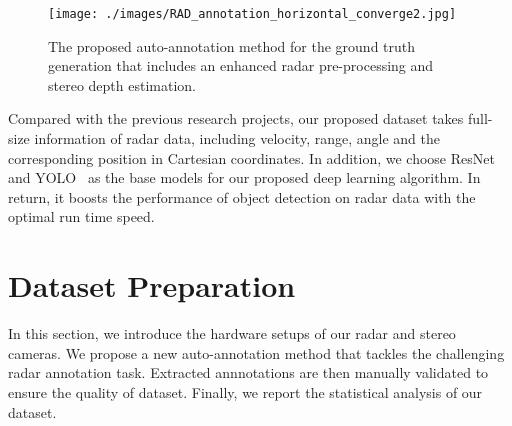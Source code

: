 \documentclass[10pt, conference, compsocconf]{IEEEtran}
\begin{document}
\begin{figure*}[!t]
	\centering
	\texttt{[image: ./images/RAD\_annotation\_horizontal\_converge2.jpg]}
	\caption{The proposed auto-annotation method for the ground truth generation that includes an enhanced radar pre-processing and stereo depth estimation.}
	\label{F:InstancizeProposal}
\end{figure*}

Compared with the previous research projects, our proposed dataset takes full-size information of radar data, including velocity, range, angle and the corresponding position in Cartesian coordinates. In addition, we choose ResNet~\cite{BG:ResNet} and YOLO~\cite{Ref:YOLOv4} as the base models for our proposed deep learning algorithm. In return, it boosts the performance of object detection on radar data with the optimal run time speed.


\section{Dataset Preparation}


In this section, we introduce the hardware setups of our radar and stereo cameras. We propose a new auto-annotation method that tackles the challenging radar annotation task. Extracted annnotations are then manually validated to ensure the quality of dataset. Finally, we report the statistical analysis of our dataset.

\end{document}
